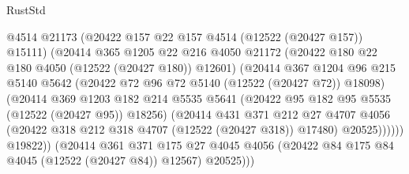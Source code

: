 \begin{lexlean}{RustStd}
\begin{coremodule}
                                    @4514
                                    @21173
                                    (@20422 @157 @22 @157 @4514 (@12522 (@20427 @157)) @15111)
                                    (@20414
                                      @365
                                      @1205
                                      @22
                                      @216
                                      @4050
                                      @21172
                                      (@20422 @180 @22 @180 @4050 (@12522 (@20427 @180)) @12601)
                                      (@20414
                                        @367
                                        @1204
                                        @96
                                        @215
                                        @5140
                                        @5642
                                        (@20422 @72 @96 @72 @5140 (@12522 (@20427 @72)) @18098)
                                        (@20414
                                          @369
                                          @1203
                                          @182
                                          @214
                                          @5535
                                          @5641
                                          (@20422 @95 @182 @95 @5535 (@12522 (@20427 @95)) @18256)
                                          (@20414
                                            @431
                                            @371
                                            @212
                                            @27
                                            @4707
                                            @4056
                                            (@20422
                                              @318
                                              @212
                                              @318
                                              @4707
                                              (@12522 (@20427 @318))
                                              @17480)
                                            @20525))))))
                                @19822))
                            (@20414
                              @361
                              @371
                              @175
                              @27
                              @4045
                              @4056
                              (@20422 @84 @175 @84 @4045 (@12522 (@20427 @84)) @12567)
                              @20525)))

\end{coremodule}
\end{lexlean}
